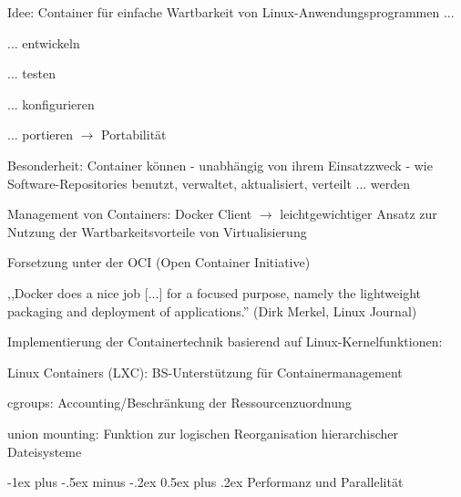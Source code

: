\documentclass[a4paper]{article}
\makeatletter
\renewcommand{\section}{\@startsection{section}{1}{0mm}%
 {-1ex plus -.5ex minus -.2ex}%
 {0.5ex plus .2ex}%
 {\normalfont\large\bfseries}}
\makeatother
\begin{document}
\begin{multicols}{3}
    \begin{itemize*}
        \item
        Idee: Container für einfache Wartbarkeit von
        Linux-Anwendungsprogrammen ...
        \begin{itemize*}
            \item ... entwickeln
            \item ... testen
            \item ... konfigurieren
            \item ... portieren $\rightarrow$ Portabilität
        \end{itemize*}
        \item
        Besonderheit: Container können - unabhängig von ihrem Einsatzzweck -
        wie Software-Repositories benutzt, verwaltet, aktualisiert, verteilt
        ... werden
        \item
        Management von Containers: Docker Client $\rightarrow$
        leichtgewichtiger Ansatz zur Nutzung der Wartbarkeitsvorteile von
        Virtualisierung
        \item
        Forsetzung unter der OCI (Open Container Initiative)
        \begin{itemize*}
            \item ,,Docker does a nice job {[}...{]} for a focused purpose, namely the lightweight packaging and deployment of applications.'' (Dirk Merkel, Linux Journal)
        \end{itemize*}
        \item
        Implementierung der Containertechnik basierend auf
        Linux-Kernelfunktionen:
        \begin{itemize*}
            \item Linux Containers (LXC): BS-Unterstützung für Containermanagement
            \item cgroups: Accounting/Beschränkung der Ressourcenzuordnung
            \item union mounting: Funktion zur logischen Reorganisation hierarchischer Dateisysteme
        \end{itemize*}
        \item
    \end{itemize*}


    \section{Performanz und
      Parallelität}



\end{multicols}
\end{document}
